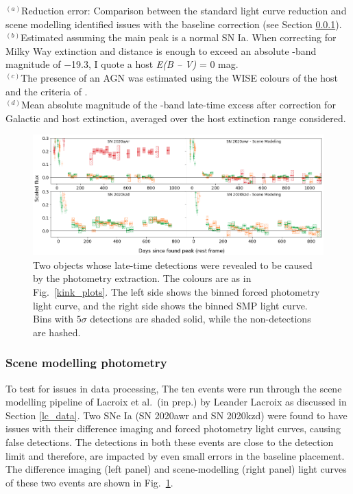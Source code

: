 \documentclass[a4paper,oneside,12pt, class=Latex/Classes/PhDthesisPSnPDF, crop=false]{standalone}
\begin{document}
\begin{table}
{\begin{tabular}{lccccccccccccc}
   \hline
 \end{tabular}}
 \label{alt_trans_res}
\begin{flushleft}
$^{(a)}$Reduction error: Comparison between the standard light curve reduction and scene modelling identified issues with the baseline correction (see Section \ref{sec:scene_modelling}).\\
$^{(b)}$Estimated assuming the main peak is a normal SN Ia. When correcting for Milky Way extinction and distance is enough to exceed an absolute \ztfg-band magnitude of $-$19.3, I quote a host \textit{E(B -- V)} = 0 mag. \\
$^{(c)}$The presence of an AGN was estimated using the WISE colours of the host and the criteria of \cite{WISE_crit}.\\
$^{(d)}$Mean absolute magnitude of the \ztfr-band late-time excess after correction for Galactic and host extinction, averaged over the host extinction range considered.\\
\end{flushleft}
\end{table} 

\begin{figure}
 \centering
 \includegraphics[width=\textwidth]{../Images/chapter_3/other_red_err_plots.png}
 \caption{Two objects whose late-time detections were revealed to be caused by the photometry extraction. The colours are as in Fig.~\ref{kink_plots}. The left side shows the binned forced photometry light curve, and the right side shows the binned SMP light curve. Bins with $5\sigma$ detections are shaded solid, while the non-detections are hashed.}
 \label{other_red_errs}
\end{figure}


\subsubsection{Scene modelling photometry}
\label{sec:scene_modelling}
To test for issues in data processing, The ten events were run through the scene modelling pipeline of Lacroix et al.~(in prep.) by Leander Lacroix as discussed in Section \ref{lc_data}. Two SNe Ia (SN 2020awr and SN 2020kzd) were found to have issues with their difference imaging and forced photometry light curves, causing false detections. The detections in both these events are close to the detection limit and therefore, are impacted by even small errors in the baseline placement. The difference imaging (left panel) and scene-modelling (right panel) light curves of these two events are shown in Fig.~\ref{other_red_errs}. 
\end{document}
